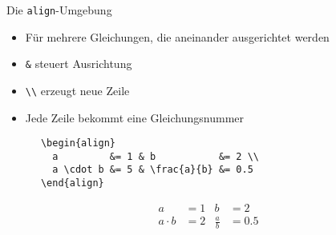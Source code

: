 \begin{frame}[fragile]{Die \texttt{align}-Umgebung}
  \begin{itemize}
    \item Für mehrere Gleichungen, die aneinander ausgerichtet werden
    \item \lstinline+&+ steuert Ausrichtung
    \item \lstinline+\\+ erzeugt neue Zeile
    \item Jede Zeile bekommt eine Gleichungsnummer
  \end{itemize}
  \begin{CodeExample}{0.63}
    \begin{lstlisting}
      \begin{align}
        a         &= 1 & b           &= 2 \\
        a \cdot b &= 5 & \frac{a}{b} &= 0.5
      \end{align}
    \end{lstlisting}
  \CodeResult
    \begin{minipage}[c][4\baselineskip][c]{\textwidth}
      \begin{align}
        a         &= 1 & b           &= 2 \\
        a \cdot b &= 2 & \frac{a}{b} &= 0.5
      \end{align}
    \end{minipage}
  \end{CodeExample}
\end{frame}

